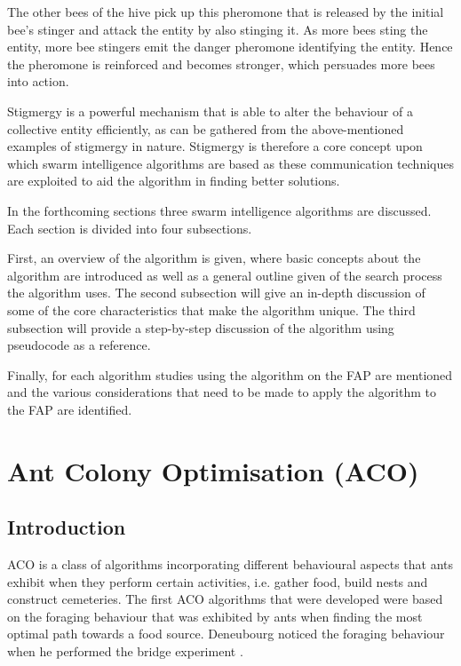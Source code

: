 The other bees of the hive pick up this pheromone that is released by the initial bee's stinger and attack the entity by also stinging it\cite{stigmergicoptimization}. As more bees sting the entity, more bee stingers emit the danger pheromone identifying the entity\cite{stigmergicoptimization}. Hence the pheromone is reinforced and becomes stronger, which persuades more bees into action\cite{stigmergicoptimization}.

Stigmergy is a powerful mechanism that is able to alter the behaviour of a collective entity efficiently, as can be gathered from the above-mentioned examples of stigmergy in nature\cite{AntsAndStigmergy,CompuIntelligenceIntro,AntIntroTrends}. Stigmergy is therefore a core concept upon which swarm intelligence algorithms are based as these communication techniques are exploited to aid the algorithm in finding better solutions\cite{AntsAndStigmergy,CompuIntelligenceIntro,AntIntroTrends}.

In the forthcoming sections three swarm intelligence algorithms are discussed. Each section is divided into four subsections. 

First, an overview of the algorithm is given, where basic concepts about the algorithm are introduced as well as a general outline given of the search process the algorithm uses. 
The second subsection will give an in-depth discussion of some of the core characteristics that make the algorithm unique. 
The third subsection will provide a step-by-step discussion of the algorithm using pseudocode as a reference.

Finally, for each algorithm studies using the algorithm on the \gls{FAP} are mentioned and the various considerations that need to be made to apply the algorithm to the \gls{FAP} are identified.

\section{Ant Colony Optimisation (ACO)}
\label{sec:ACO}
\subsection{Introduction}
\label{sec:ACOverview}
ACO is a class of algorithms incorporating different behavioural aspects that ants exhibit when they perform certain activities, i.e. gather food, build nests and construct cemeteries\cite{AntsAndStigmergy,CompuIntelligenceIntro}. The first \gls{ACO} algorithms that were developed were based on the foraging behaviour that was exhibited by ants when finding the most optimal path towards a food source. Deneubourg noticed the foraging behaviour when he performed the bridge experiment \cite{AntsAndStigmergy,CompuIntelligenceIntro}.

